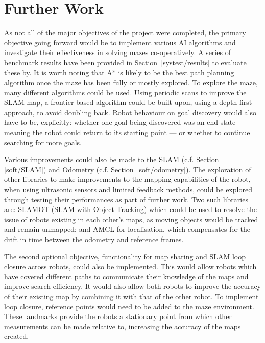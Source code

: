 
\chapter{Further Work}\label{furtherwork}
As not all of the major objectives of the project were completed, the primary objective going forward would be to implement various AI algorithms and investigate 
their effectiveness in solving mazes co-operatively.  A series of benchmark 
results have been provided in Section~\ref{systest/results} to evaluate 
these by. It is worth noting that A* is likely to be the best path planning 
algorithm once the maze has been fully or mostly explored. To 
explore the maze, many different algorithms could be used. Using periodic scans
to improve the SLAM map, a frontier-based algorithm could be built upon, using a 
depth first approach, to avoid doubling back. 
Robot behaviour on goal discovery would also have to be, explicitly: whether 
one goal being discovered was an end state --- meaning the robot could return 
to its starting point --- or whether to continue searching for more goals.
  
Various improvements could also be made to the SLAM (c.f. Section~
\ref{soft/SLAM}) and Odometry (c.f. Section~\ref{soft/odometry}).  
The exploration of other libraries to make improvements to the mapping 
capabilities of the robot, when using ultrasonic sensors and limited feedback 
methods, could be explored through testing their performances as part of
further work. Two such libraries are: SLAMOT (SLAM with Object Tracking) which 
could be used to resolve the issue of robots existing in each other's maps, as 
moving objects would be tracked and remain unmapped; and AMCL for
localisation, which compensates for the drift in time between the odometry and 
reference frames.   

The second optional objective, functionality for map sharing and SLAM loop 
closure across robots, could also be implemented. This would allow robots which 
have covered different paths to communicate their knowledge of the maps and 
improve search efficiency. It would also allow both robots to improve the 
accuracy of their existing map by combining it with that of the other robot.
To implement loop closure, reference points would need to be added
to the maze environment. These landmarks provide the robots a stationary point 
from which other measurements can be made relative to, increasing the accuracy 
of the maps created.

